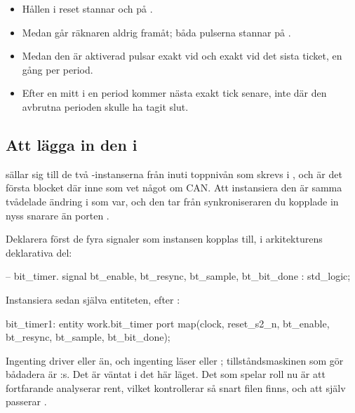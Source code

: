 \begin{itemize}
  \item Hållen i reset stannar  och  på .
  \item Medan  går räknaren aldrig framåt; båda pulserna stannar på .
  \item Medan den är aktiverad pulsar  exakt vid  och 
    exakt vid det sista ticket, en gång per period.
  \item Efter en  mitt i en period kommer nästa  exakt
     tick senare, inte där den avbrutna perioden skulle ha tagit slut.
\end{itemize}

\subsection{Att lägga in den i }
\label{c12:sub:btwire}

 sällar sig till de två -instanserna från 
inuti toppnivån som skrevs i , och är det första blocket där inne som vet något om
CAN. Att instansiera den är samma tvådelade ändring i  som
 var, och den tar  från synkroniseraren du kopplade in nyss snarare
än porten .

Deklarera först de fyra signaler som instansen kopplas till, i arkitekturens deklarativa del:

\begin{vhdlcode}
    -- bit_timer.
    signal bt_enable, bt_resync, bt_sample, bt_bit_done : std_logic;
\end{vhdlcode}

Instansiera sedan själva entiteten, efter :

\begin{vhdlcode}
    bit_timer1: entity work.bit_timer
        port map(clock, reset_s2_n, bt_enable, bt_resync, bt_sample, bt_bit_done);
\end{vhdlcode}

Ingenting driver  eller  än, och ingenting läser 
eller ; tillståndsmaskinen som gör bådadera är :s. Det är väntat i
det här läget. Det som spelar roll nu är att  fortfarande analyserar rent,
vilket  kontrollerar så snart filen finns, och att  själv passerar
.

